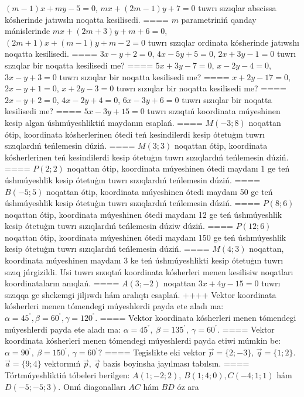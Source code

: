 $ (m-1) x+my-5=0$, $mx+ (2m-1) y+7=0$ tuwrı sızıqlar abscissa
kósherinde jatıwshı noqatta kesilisedi.
====
$m$ parametriniń qanday mánislerinde
$mx+ (2m+3) y+m+6=0$, $ (2m+1) x+ (m-1) y+m-2=0$ tuwrı sızıqlar ordinata
kósherinde jatıwshı noqatta kesilisedi.
====
$3x-y+2=0$, $4x-5y+5=0$, $2x+3y-1=0$
tuwrı sızıqlar bir noqatta kesilisedi me?
====
$5x+3y-7=0$, $x-2y-4=0$, $3x-y+3=0$
tuwrı sızıqlar bir noqatta kesilisedi me?
====
$x+2y-17=0$, $2x-y+1=0$, $x+2y-3=0$
tuwrı sızıqlar bir noqatta kesilisedi me?
====
$2x-y+2=0$, $4x-2y+4=0$, $6x-3y+6=0$
tuwrı sızıqlar bir noqatta kesilisedi me?
====
$5x-3y+15=0$ tuwrı sızıqtıń koordinata múyeshinen
kesip algan úshmúyeshliktiń maydanın esaplań.
====
$M (-3;8) $ noqattan ótip, koordinata kósherlerinen ótedi
teń kesindilerdi kesip ótetuģın tuwrı sızıqlardıń teńlemesin dúziń.
====
$M (3;3) $ noqattan ótip, koordinata kósherlerinen teń
kesindilerdi kesip ótetuģın tuwrı sızıqlardıń teńlemesin dúziń.
====
$P (2;2) $ noqattan ótip, koordinata múyeshinen ótedi
maydanı 1 ge teń úshmúyeshlik kesip ótetuģın tuwrı sızıqlardıń
teńlemesin dúziń.
====
$B (-5;5) $ noqattan ótip, koordinata múyeshinen ótedi
maydanı 50 ge teń úshmúyeshlik kesip ótetuģın tuwrı sızıqlardıń teńlemesin
dúziń.
====
$P (8;6) $ noqattan ótip, koordinata múyeshinen ótedi
maydanı 12 ge teń úshmúyeshlik kesip ótetuģın tuwrı sızıqlardıń teńlemesin dúziw
dúziń.
====
$P (12;6) $ noqattan ótip, koordinata múyeshinen ótedi
maydanı 150 ge teń úshmúyeshlik kesip ótetuģın tuwrı sızıqlardıń
teńlemesin dúziń.
====
$M (4;3) $ noqattan, koordinata múyeshinen
maydanı 3 ke teń úshmúyeshlikti kesip ótetuģın tuwrı sızıq júrgizildi.
Usi tuwrı sızıqtıń koordinata kósherleri menen kesilisiw noqatları
koordinataların anıqlań.
====
$A (3;-2) $ noqattan $3x+4y-15=0$ tuwrı sızıqqa
ge shekemgi jiljıwdı hám aralıqtı esaplań.
++++
Vektor koordinata kósherleri menen tómendegi múyeshlerdi payda ete aladı ma:
$\alpha = 45^{{^\circ}},\beta = 60^{{^\circ}},\gamma = 120^{{^\circ}}$.
====
Vektor koordinata kósherleri menen tómendegi múyeshlerdi payda ete aladı ma:
$\alpha = 45^{{^\circ}},\ \beta = 135^{{^\circ}},\ \gamma = 60^{{^\circ}}$.
====
Vektor koordinata kósherleri menen tómendegi múyeshlerdi payda etiwi
múmkin be: $\alpha = 90^{{^\circ}},\ \beta = 150^{{^\circ}}$,
$\gamma = 60^{{^\circ}}?$
====
Tegislikte eki vektor
$\overrightarrow{p} = \{ 2; - 3\}$, $\overrightarrow{q} = \{ 1;2\}$.
$\overrightarrow{a} = \{9;4\}$ vektorınıń
$\overrightarrow{p},\ \overrightarrow{q}$ bazis boyinsha jayılması tabılsın.
====
Tórtmúyeshliktiń tóbeleri berilgen:
$A (1; - 2;2) $, $B (1;4;0),C (- 4;1;1) $ hám $D (- 5; -5;3) $. Onıń diagonalları $AC$ hám $BD$ óz ara
